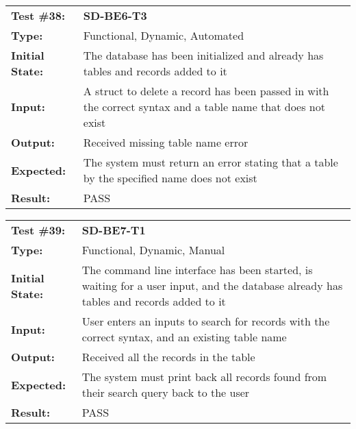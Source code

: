\documentclass[12pt, titlepage]{article}
\begin{document}
\begin{mdframed}[linewidth=1pt]
\begin{tabularx}{\textwidth}{@{}p{3cm}X@{}}
{\bf Test \#38:} & {\bf SD-BE6-T3}\\[\baselineskip]
{\bf Type:} & Functional, Dynamic, Automated \\[0.5\baselineskip]
{\bf Initial State:} & The database has been initialized and already has tables and records added to it \\[\baselineskip]
{\bf Input:} & A struct to delete a record has been passed in with the correct syntax and a table name that does not exist \\[\baselineskip]
{\bf Output:} & Received missing table name error \\[\baselineskip]
{\bf Expected:} & The system must return an error stating that a table by the specified name does not exist \\[\baselineskip]
{\bf Result:} & PASS
\end{tabularx}
\end{mdframed} 

\begin{mdframed}[linewidth=1pt]
\begin{tabularx}{\textwidth}{@{}p{3cm}X@{}}
{\bf Test \#39:} & {\bf SD-BE7-T1}\\[\baselineskip]
{\bf Type:} & Functional, Dynamic, Manual \\[0.5\baselineskip]
{\bf Initial State:} & The command line interface has been started, is waiting for a user input, and the database already has tables and records added to it \\[\baselineskip]
{\bf Input:} & User enters an inputs to search for records with the correct syntax, and an existing table name \\[\baselineskip]
{\bf Output:} & Received all the records in the table \\[\baselineskip]
{\bf Expected:} & The system must print back all records found from their search query back to the user \\[\baselineskip]
{\bf Result:} & PASS
\end{tabularx}
\end{mdframed}
\end{document}

